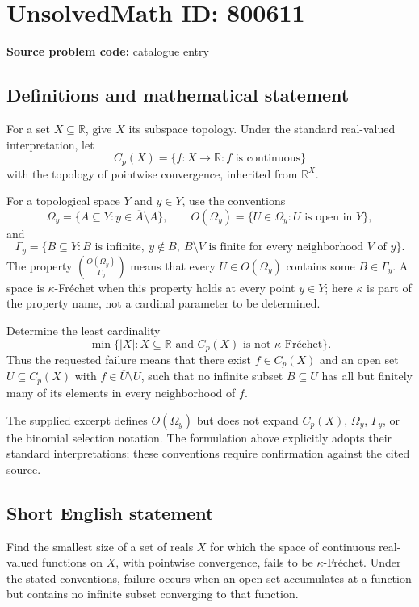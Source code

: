 \documentclass[11pt]{article}
\newcommand{\R}{\mathbb{R}}
\begin{document}
\section*{UnsolvedMath ID: 800611}
\textbf{Source problem code:} catalogue entry
\subsection{Definitions and mathematical statement}
For a set \(X\subseteq\R\), give \(X\) its subspace topology. Under the standard real-valued interpretation, let
\[
C_p(X)=\{f:X\to\R:f\text{ is continuous}\}
\]
with the topology of pointwise convergence, inherited from \(\R^X\).

For a topological space \(Y\) and \(y\in Y\), use the conventions
\[
\Omega_y=\{A\subseteq Y:y\in\overline A\setminus A\},\qquad
O(\Omega_y)=\{U\in\Omega_y:U\text{ is open in }Y\},
\]
and
\[
\Gamma_y=\{B\subseteq Y:B\text{ is infinite},\ y\notin B,\ B\setminus V\text{ is finite for every neighborhood }V\text{ of }y\}.
\]
The property \(\binom{O(\Omega_y)}{\Gamma_y}\) means that every \(U\in O(\Omega_y)\) contains some \(B\in\Gamma_y\). A space is \(\kappa\)-Fr\'echet when this property holds at every point \(y\in Y\); here \(\kappa\) is part of the property name, not a cardinal parameter to be determined.

Determine the least cardinality
\[
\min\bigl\{|X|:X\subseteq\R\text{ and }C_p(X)\text{ is not }\kappa\text{-Fr\'echet}\bigr\}.
\]
Thus the requested failure means that there exist \(f\in C_p(X)\) and an open set \(U\subseteq C_p(X)\) with \(f\in\overline U\setminus U\), such that no infinite subset \(B\subseteq U\) has all but finitely many of its elements in every neighborhood of \(f\).

The supplied excerpt defines \(O(\Omega_y)\) but does not expand \(C_p(X)\), \(\Omega_y\), \(\Gamma_y\), or the binomial selection notation. The formulation above explicitly adopts their standard interpretations; these conventions require confirmation against the cited source.
\subsection{Short English statement}
Find the smallest size of a set of reals \(X\) for which the space of continuous real-valued functions on \(X\), with pointwise convergence, fails to be \(\kappa\)-Fr\'echet. Under the stated conventions, failure occurs when an open set accumulates at a function but contains no infinite subset converging to that function.
\end{document}

